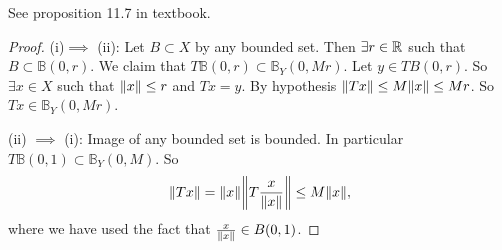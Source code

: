 \begin{proposition}
	See proposition 11.7 in textbook.
\end{proposition}
\begin{proof}
	(i)$ \implies $ (ii): Let $ B \subset X $ by any bounded set. Then $ \exists r \in \mathbb{R} $ such that $ B \subset \mathbb{B}(0,r) $. We claim that $ T\mathbb{B}(0,r) \subset \mathbb{B}_{Y}(0,Mr) $. Let $ y \in TB(0,r) $. So $ \exists x \in X $ such that $ \norm{x} \leq r $ and $ Tx = y $. By hypothesis $ \norm{Tx} \leq M\norm{x} \leq Mr $.  So $ Tx \in \mathbb{B}_Y(0,Mr) $.
	
	(ii) $ \implies $ (i): Image of any bounded set is bounded. In particular $ T\mathbb{B}(0,1) \subset \mathbb{B}_Y(0,M) $. So
	\[ \norm{Tx} = \norm{x}\norm{T\frac{x}{\norm{x}}} \leq M\norm{x}, \]
	where we have used the fact that $ \frac{x}{\norm{x}} \in B(0,1) $.
\end{proof}